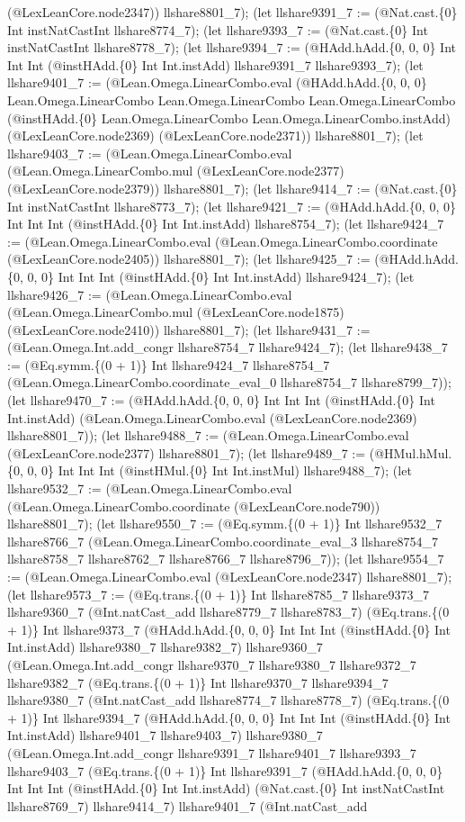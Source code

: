 \documentclass[11pt]{article}
\begin{document}
(@LexLeanCore.node2347)) llshare8801\_7); (let llshare9391\_7 := (@Nat.cast.\{0\} Int instNatCastInt llshare8774\_7); (let llshare9393\_7 := (@Nat.cast.\{0\} Int instNatCastInt llshare8778\_7); (let llshare9394\_7 := (@HAdd.hAdd.\{0, 0, 0\} Int Int Int (@instHAdd.\{0\} Int Int.instAdd) llshare9391\_7 llshare9393\_7); (let llshare9401\_7 := (@Lean.Omega.LinearCombo.eval (@HAdd.hAdd.\{0, 0, 0\} Lean.Omega.LinearCombo Lean.Omega.LinearCombo Lean.Omega.LinearCombo (@instHAdd.\{0\} Lean.Omega.LinearCombo Lean.Omega.LinearCombo.instAdd) (@LexLeanCore.node2369) (@LexLeanCore.node2371)) llshare8801\_7); (let llshare9403\_7 := (@Lean.Omega.LinearCombo.eval (@Lean.Omega.LinearCombo.mul (@LexLeanCore.node2377) (@LexLeanCore.node2379)) llshare8801\_7); (let llshare9414\_7 := (@Nat.cast.\{0\} Int instNatCastInt llshare8773\_7); (let llshare9421\_7 := (@HAdd.hAdd.\{0, 0, 0\} Int Int Int (@instHAdd.\{0\} Int Int.instAdd) llshare8754\_7); (let llshare9424\_7 := (@Lean.Omega.LinearCombo.eval (@Lean.Omega.LinearCombo.coordinate (@LexLeanCore.node2405)) llshare8801\_7); (let llshare9425\_7 := (@HAdd.hAdd.\{0, 0, 0\} Int Int Int (@instHAdd.\{0\} Int Int.instAdd) llshare9424\_7); (let llshare9426\_7 := (@Lean.Omega.LinearCombo.eval (@Lean.Omega.LinearCombo.mul (@LexLeanCore.node1875) (@LexLeanCore.node2410)) llshare8801\_7); (let llshare9431\_7 := (@Lean.Omega.Int.add\_congr llshare8754\_7 llshare9424\_7); (let llshare9438\_7 := (@Eq.symm.\{(0 + 1)\} Int llshare9424\_7 llshare8754\_7 (@Lean.Omega.LinearCombo.coordinate\_eval\_0 llshare8754\_7 llshare8799\_7)); (let llshare9470\_7 := (@HAdd.hAdd.\{0, 0, 0\} Int Int Int (@instHAdd.\{0\} Int Int.instAdd) (@Lean.Omega.LinearCombo.eval (@LexLeanCore.node2369) llshare8801\_7)); (let llshare9488\_7 := (@Lean.Omega.LinearCombo.eval (@LexLeanCore.node2377) llshare8801\_7); (let llshare9489\_7 := (@HMul.hMul.\{0, 0, 0\} Int Int Int (@instHMul.\{0\} Int Int.instMul) llshare9488\_7); (let llshare9532\_7 := (@Lean.Omega.LinearCombo.eval (@Lean.Omega.LinearCombo.coordinate (@LexLeanCore.node790)) llshare8801\_7); (let llshare9550\_7 := (@Eq.symm.\{(0 + 1)\} Int llshare9532\_7 llshare8766\_7 (@Lean.Omega.LinearCombo.coordinate\_eval\_3 llshare8754\_7 llshare8758\_7 llshare8762\_7 llshare8766\_7 llshare8796\_7)); (let llshare9554\_7 := (@Lean.Omega.LinearCombo.eval (@LexLeanCore.node2347) llshare8801\_7); (let llshare9573\_7 := (@Eq.trans.\{(0 + 1)\} Int llshare8785\_7 llshare9373\_7 llshare9360\_7 (@Int.natCast\_add llshare8779\_7 llshare8783\_7) (@Eq.trans.\{(0 + 1)\} Int llshare9373\_7 (@HAdd.hAdd.\{0, 0, 0\} Int Int Int (@instHAdd.\{0\} Int Int.instAdd) llshare9380\_7 llshare9382\_7) llshare9360\_7 (@Lean.Omega.Int.add\_congr llshare9370\_7 llshare9380\_7 llshare9372\_7 llshare9382\_7 (@Eq.trans.\{(0 + 1)\} Int llshare9370\_7 llshare9394\_7 llshare9380\_7 (@Int.natCast\_add llshare8774\_7 llshare8778\_7) (@Eq.trans.\{(0 + 1)\} Int llshare9394\_7 (@HAdd.hAdd.\{0, 0, 0\} Int Int Int (@instHAdd.\{0\} Int Int.instAdd) llshare9401\_7 llshare9403\_7) llshare9380\_7 (@Lean.Omega.Int.add\_congr llshare9391\_7 llshare9401\_7 llshare9393\_7 llshare9403\_7 (@Eq.trans.\{(0 + 1)\} Int llshare9391\_7 (@HAdd.hAdd.\{0, 0, 0\} Int Int Int (@instHAdd.\{0\} Int Int.instAdd) (@Nat.cast.\{0\} Int instNatCastInt llshare8769\_7) llshare9414\_7) llshare9401\_7 (@Int.natCast\_add 
\end{document}
